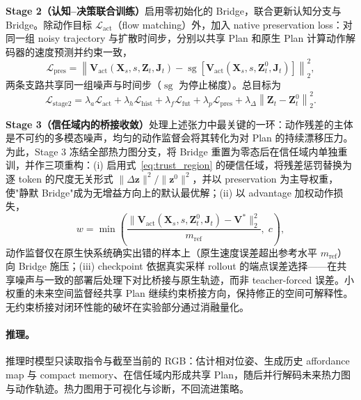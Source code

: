 \documentclass[10pt]{ctexart}
\begin{document}
\textbf{Stage 2（认知--决策联合训练）}启用零初始化的 Bridge，联合更新认知分支与 Bridge。除动作目标 $\mathcal{L}_{\mathrm{act}}$（flow matching）外，加入 native preservation loss：对同一组 noisy trajectory 与扩散时间步，分别以共享 Plan 和原生 Plan 计算动作解码器的速度预测并约束一致，
\begin{equation}
\mathcal{L}_{\mathrm{pres}}
=
\left\|
\mathbf{V}_{\mathrm{act}}
\left(
\mathbf{X}_s,s,\mathbf{Z}_t,\mathbf{J}_t
\right)
-
\operatorname{sg}
\left[
\mathbf{V}_{\mathrm{act}}
\left(
\mathbf{X}_s,s,\mathbf{Z}^{0}_t,\mathbf{J}_t
\right)
\right]
\right\|_2^2,
\label{eq:preservation}
\end{equation}
两条支路共享同一组噪声与时间步（$\operatorname{sg}$ 为停止梯度）。总目标为
\begin{equation}
\mathcal{L}_{\mathrm{stage2}}
=
\lambda_a\mathcal{L}_{\mathrm{act}}
+
\lambda_h\mathcal{L}_{\mathrm{hist}}
+
\lambda_f\mathcal{L}_{\mathrm{fut}}
+
\lambda_p\mathcal{L}_{\mathrm{pres}}
+
\lambda_{\Delta}
\left\|
\mathbf{Z}_t-\mathbf{Z}^{0}_t
\right\|_2^2.
\label{eq:stage2}
\end{equation}

\textbf{Stage 3（信任域内的桥接收敛）}处理上述张力中最关键的一环：动作残差的主体是不可约的多模态噪声，均匀的动作监督会将其转化为对 Plan 的持续漂移压力。为此，Stage 3 冻结全部热力图分支，将 Bridge 重置为零态后在信任域内单独重训，并作三项重构：(i) 启用式~\eqref{eq:trust_region} 的硬信任域，将残差惩罚替换为逐 token 的尺度无关形式 $\|\Delta\mathbf{z}\|^2/\|\mathbf{z}^{0}\|^2$，并以 preservation 为主导权重，使"静默 Bridge"成为无增益方向上的默认最优解；(ii) 以 advantage 加权动作损失，
\begin{equation}
w
=
\min\!\left(
\frac{
\bigl\|
\mathbf{V}_{\mathrm{act}}(\mathbf{X}_s,s,\mathbf{Z}^{0}_t,\mathbf{J}_t)-\mathbf{V}^{\ast}
\bigr\|_2^2
}{
m_{\mathrm{ref}}
},\;
c
\right),
\label{eq:advantage}
\end{equation}
动作监督仅在原生快系统确实出错的样本上（原生速度误差超出参考水平 $m_{\mathrm{ref}}$）向 Bridge 施压；(iii) checkpoint 依据真实采样 rollout 的端点误差选择——在共享噪声与一致的部署后处理下对比桥接与原生轨迹，而非 teacher-forced 误差。小权重的未来空间监督经共享 Plan 继续约束桥接方向，保持修正的空间可解释性。无约束桥接对闭环性能的破坏在实验部分通过消融量化。

\paragraph{推理。}
推理时模型只读取指令与截至当前的 RGB：估计相对位姿、生成历史 affordance map 与 compact memory、在信任域内形成共享 Plan，随后并行解码未来热力图与动作轨迹。热力图用于可视化与诊断，不回流进策略。
\end{document}
